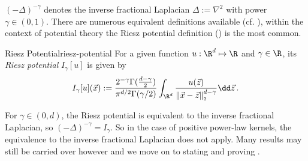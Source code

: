 $(-\Delta)^{-\gamma}$ denotes the inverse fractional Laplacian $\Delta := \nabla^2$ with power $\gamma \in (0, 1)$.
There are numerous equivalent definitions available (cf. \cite{2015-fractional-laplacian-definitions}), within the context of potential theory the Riesz potential definition () is the most common.

\begin{definition}{Riesz Potential}{riesz-potential}
  For a given function $u: \R^d \mapsto \R$ and $\gamma \in \R$, its \textit{Riesz potential} $I_{\gamma}[u]$ is given by
  $$I_{\gamma}[u](\vec{x}) := \frac{2^{-\gamma} \Gamma(\tfrac{d-\gamma}{2})}{\pi^{d/2} \Gamma(\gamma/2)} \int_{\R^d} \frac{u(\vec{z})}{\norm{\vec{x}-\vec{z}}^{d-\gamma}} \dd\vec{z}\,.$$
\end{definition}

For $\gamma \in (0, d)$, the Riesz potential is equivalent to the inverse fractional Laplacian, so $(-\Delta)^{-\gamma} = I_\gamma$.
So in the case of positive power-law kernels, the equivalence to the inverse fractional Laplacian does not apply.
Many results may still be carried over however and we move on to stating and proving .
